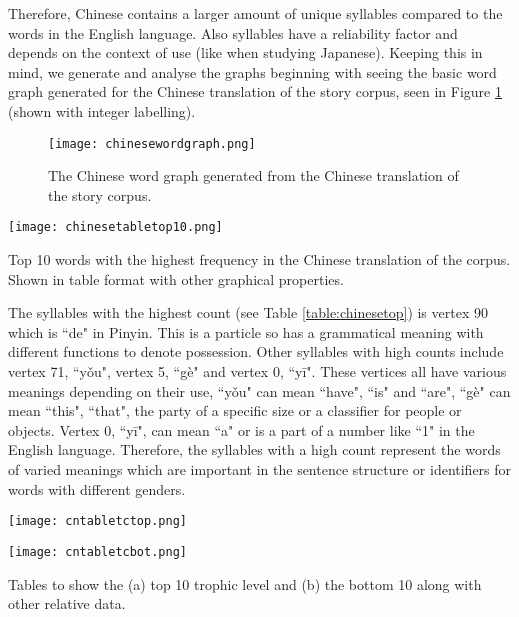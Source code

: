 Therefore, Chinese contains a larger amount of unique syllables compared to the words in the English language. Also syllables have a reliability factor and depends on the context of use (like when studying Japanese). Keeping this in mind, we generate and analyse the graphs beginning with seeing the basic word graph generated for the Chinese translation of the story corpus, seen in Figure \ref{fig:cngraph} (shown with integer labelling).

\begin{figure}[!htb]
\centering
\texttt{[image: chinesewordgraph.png]}
\caption{The Chinese word graph generated from the Chinese translation of the story corpus.}
\label{fig:cngraph}
\end{figure}

\begin{table}[!htb]
\centering
\texttt{[image: chinesetabletop10.png]}
\caption{Top 10 words with the highest frequency in the Chinese translation of the corpus. Shown in table format with other graphical properties. }
\label{table:chinesetop}
\end{table}

The syllables with the highest count (see Table \ref{table:chinesetop}) is vertex 90 which is ``de" in Pinyin. This is a particle so has a grammatical meaning with different functions to denote possession. Other syllables with high counts include vertex 71, ``yǒu", vertex 5, ``gè" and vertex 0, ``yī". These vertices all have various meanings depending on their use, ``yǒu" can mean ``have", ``is" and ``are", ``gè" can mean ``this", ``that", the party of a specific size or a classifier for people or objects. Vertex 0, ``yī", can mean ``a" or is a part of a number like ``1" in the English language. Therefore, the syllables with a high count represent the words of varied meanings which are important in the sentence structure or identifiers for words with different genders.

\begin{table}[!htb]
\centering
\begin{subtable}{.45\textwidth}
	\centering
	\texttt{[image: cntabletctop.png]}
	\caption{}
	\label{table:chinesetoptc}
\end{subtable}
\hfill
\begin{subtable}{.45\textwidth}
	\centering
	\texttt{[image: cntabletcbot.png]}
	\caption{}
	\label{table:chinesebottc}
\end{subtable}
\caption{Tables to show the (a) top 10 trophic level and (b) the bottom 10 along with other relative data.}
\end{table}

